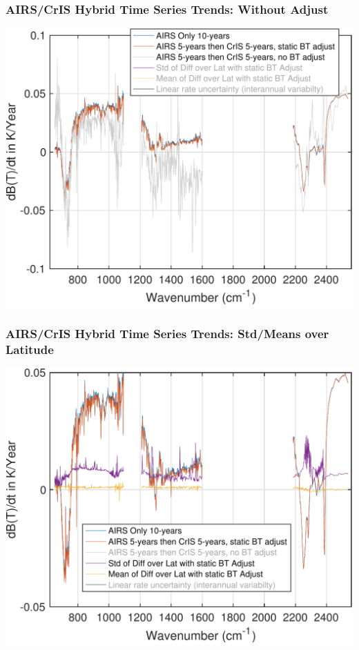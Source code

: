 \documentclass[10pt,t]{beamer}
\begin{document}
\begin{frame}
  \frametitle{AIRS/CrIS Hybrid Time Series Trends: Without Adjust}
  \centering \includegraphics[width=0.8\linewidth]{Figs/trend_airs_vs_airs2cris_and_wo_adjust.pdf}
\end{frame}
\begin{frame}
  \frametitle{\small AIRS/CrIS Hybrid Time Series Trends: Std/Means over Latitude}
  \centering  \includegraphics[width=0.8\linewidth]{Figs/trend_airs_vs_airs2cris_mean_std_diff_over_lat.pdf}
\end{frame}
\end{document}
